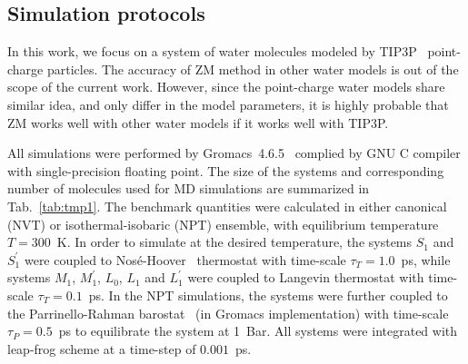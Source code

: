\documentclass[a4paper,preprint,unsortedaddress,onecolumn,fleqn]{revtex4}
\begin{document}
\subsection{Simulation protocols}

\label{sec:protocols} In this work, we focus on a system of water molecules
modeled by TIP3P~\cite{jorgensen1983comparison} point-charge particles. 
The accuracy of ZM method in other water models is out of the scope of the
current work. However, since the point-charge water models share similar
idea, and only differ in the model parameters, it is highly probable that ZM
works well with other water models if it works well with TIP3P.

All simulations were performed by Gromacs~4.6.5~\cite{hess2008gromacs,
pronk2013gromacs} complied by GNU C compiler with single-precision floating
point. The size of the systems and corresponding number of molecules used
for MD simulations are summarized in Tab.~\ref{tab:tmp1}. The benchmark
quantities were calculated in either canonical (NVT) or isothermal-isobaric
(NPT) ensemble, with equilibrium temperature $T=300$~K. In order to simulate
at the desired temperature, the systems $S_{1}$ and $S_{1}^{\prime }$ were
coupled to Nos\'{e}-Hoover~\cite{nose1984molecular,hoover1985canonical}
thermostat with time-scale $\tau _{T}=1.0$~ps, while systems $M_{1}$, $%
M_{1}^{\prime }$, $L_{0}$, $L_{1}$ and $L_{1}^{\prime }$ were coupled to
Langevin thermostat with time-scale $\tau _{T}=0.1$~ps. In the NPT
simulations, the systems were further coupled to the Parrinello-Rahman
barostat~\cite{parrinello1980crystal,parrinello1981polymorphic} (in Gromacs
implementation) with time-scale $\tau _{P}=0.5$~ps to equilibrate the system
at 1~Bar. All systems were integrated with leap-frog scheme at a time-step
of $0.001$~ps.

\end{document}
